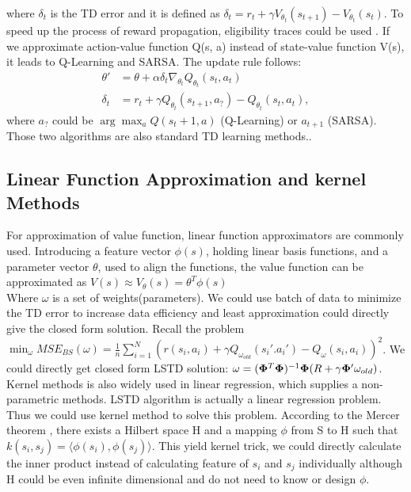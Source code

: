 where $\delta_t$ is the TD error and it is defined as $\delta_t = r_{t} + \gamma V_{\theta_t}(s_{t+1}) - V_{\theta_t}(s_t)$.
To speed up the process of reward propagation, eligibility traces could be used \cite{boyan1999least}. 
If we approximate action-value function Q(s, a) instead of state-value function V(s), it leads to Q-Learning and SARSA. The update rule follows: 
\begin{align}
\theta ' &= \theta + \alpha \delta_t \nabla_{\theta_t} Q_{\theta_t}(s_t, a_t) \label{equ:Q:learn}\\
\delta_t &= r_{t} + \gamma Q_{\theta_t}(s_{t+1}, a_{?}) - Q_{\theta_t}(s_t, a_t) \label{equ:Q:learn2},
\end{align}
where $a_{?}$ could be $\arg\max_a Q(s_t+1, a)$ (Q-Learning) or $a_{t+1}$ (SARSA). Those two algorithms are also standard TD learning methods..
\subsection{Linear Function Approximation and kernel Methods } %
For approximation of value function, linear function approximators are commonly used. Introducing a feature vector $\phi(s)$, holding linear basis functions, and a parameter vector $\theta$,
used to align the functions, the value function can be approximated as  $V(s) \approx V_\theta (s) = \theta^T \phi (s)$\\
 Where $\omega$ is a set of weights(parameters). We could use batch of data to minimize the TD error to increase data efficiency and least approximation could directly give the closed form solution. Recall the problem
$\min_\omega MSE_{BS}(\omega) = \frac{1}{n} \sum_{i=1}^{N}(r(s_i, a_i) + \gamma Q_{\omega_{old}} (s_i'. a_i') - Q_\omega (s_i, a_i) )^2$. We could directly get closed form LSTD solution: $\omega = (\vec{\Phi}^T \vec\Phi)^{-1}\vecPhi(R+\gamma\vecPhi' \omega_{old})$. 
\\
Kernel methods is also widely used in linear regression, which supplies a non-parametric methods.  LSTD algorithm is actually a linear regression problem. Thus we could use kernel method to solve this problem. According to the Mercer theorem \cite{vapnik1999overview}, there exists a Hilbert space H and a mapping $\phi$ from S to H such that $k(s_i, s_j) = \langle \phi(s_i), \phi(s_j) \rangle$. This yield kernel trick, we could directly calculate the inner product instead of calculating feature of $s_i$ and $s_j$ individually although H could be even infinite dimensional and do not need to know or design $\phi$. 



